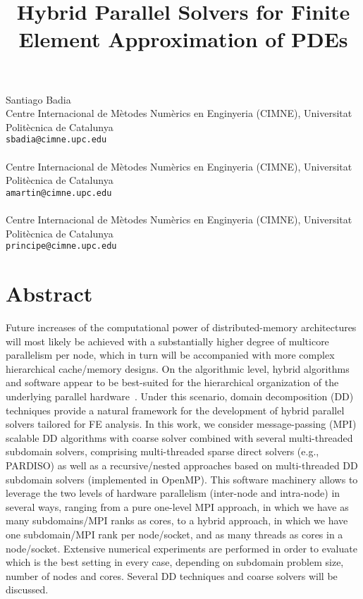 \title{Hybrid Parallel Solvers for Finite Element Approximation of PDEs}
\author{}  \institute{}
\maketitle
\begin{center}
{\large Santiago Badia}\\
Centre Internacional de M\`etodes Num\`erics en Enginyeria (CIMNE), Universitat Polit\`ecnica de Catalunya\\
{\tt sbadia@cimne.upc.edu}
\\ \vspace{4mm}{\large Alberto F. Mart\'in}\\
Centre Internacional de M\`etodes Num\`erics en Enginyeria (CIMNE), Universitat Polit\`ecnica de Catalunya\\
{\tt amartin@cimne.upc.edu}
\\ \\
Centre Internacional de M\`etodes Num\`erics en Enginyeria (CIMNE), Universitat Polit\`ecnica de Catalunya\\
{\tt principe@cimne.upc.edu}

\end{center}

\section*{Abstract}

Future increases of the computational power of  
distributed-memory architectures will 
most likely be achieved with a substantially higher degree 
of multicore parallelism per node, which
in turn will be accompanied with more complex hierarchical
cache/memory designs. On the algorithmic level,
hybrid algorithms and software appear to be best-suited 
for the hierarchical organization
of the underlying parallel hardware~\cite{RBH}. 
Under this scenario, domain decomposition (DD) techniques provide a natural 
framework for the development of hybrid parallel solvers 
tailored for FE analysis. In this work, we consider message-passing (MPI) scalable DD algorithms with 
coarse solver combined with several multi-threaded subdomain solvers, comprising
multi-threaded sparse direct solvers (e.g., PARDISO) as well as a recursive/nested
approaches based on multi-threaded DD subdomain solvers (implemented in OpenMP).
This software machinery allows to leverage the two levels of hardware parallelism
(inter-node and intra-node) in several ways, ranging from a pure one-level MPI approach, 
in which we have as many subdomains/MPI ranks as cores, to a hybrid approach, in which we
have one subdomain/MPI rank per node/socket, and as many threads as cores in a node/socket.
Extensive numerical experiments are performed in order to evaluate which is the best
setting in every case, depending on subdomain problem size, number of nodes and cores. Several 
DD techniques and coarse solvers will be discussed.

